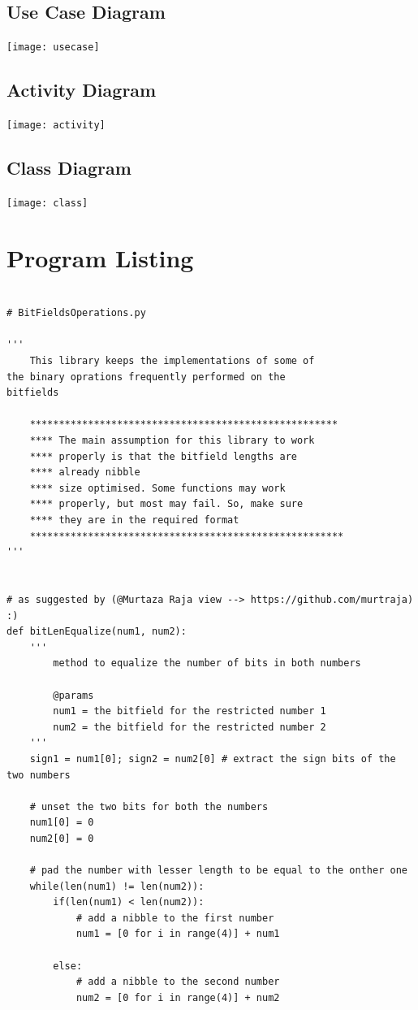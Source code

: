\documentclass[10pt,a4paper]{article}
\newenvironment{changemargin}[2]{%
\begin{list}{}{%
\setlength{\topsep}{0pt}%
\setlength{\leftmargin}{#1}%
\setlength{\rightmargin}{#2}%
\setlength{\listparindent}{\parindent}%
\setlength{\itemindent}{\parindent}%
\setlength{\parsep}{\parskip}%
}%
\item[]}{\end{list}}
\begin{document}
\subsection{Use Case Diagram}
	\texttt{[image: usecase]}


\subsection{Activity Diagram}
	\texttt{[image: activity]}
			
\subsection{Class Diagram}
	\texttt{[image: class]}

\newpage
\begin{changemargin}{-4cm}{-4cm}
\section{Program Listing}
\begin{lstlisting}

# BitFieldsOperations.py

'''
	This library keeps the implementations of some of 
the binary oprations frequently performed on the 
bitfields

	*****************************************************
	**** The main assumption for this library to work 
	**** properly is that the bitfield lengths are 	
	**** already nibble
	**** size optimised. Some functions may work 
	**** properly, but most may fail. So, make sure 	
	**** they are in the required format	
	******************************************************
'''


# as suggested by (@Murtaza Raja view --> https://github.com/murtraja) :)
def bitLenEqualize(num1, num2):
	'''
		method to equalize the number of bits in both numbers
			
		@params
		num1 = the bitfield for the restricted number 1
		num2 = the bitfield for the restricted number 2
	'''
	sign1 = num1[0]; sign2 = num2[0] # extract the sign bits of the two numbers
	
	# unset the two bits for both the numbers
	num1[0] = 0
	num2[0] = 0 
	
	# pad the number with lesser length to be equal to the onther one
	while(len(num1) != len(num2)):
		if(len(num1) < len(num2)):
			# add a nibble to the first number
			num1 = [0 for i in range(4)] + num1

		else: 
			# add a nibble to the second number
			num2 = [0 for i in range(4)] + num2


\end{lstlisting}
\end{changemargin}
\end{document}
